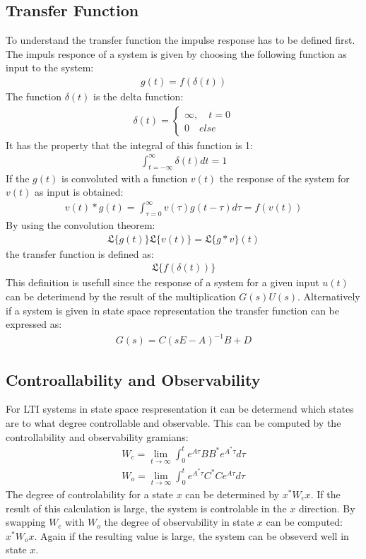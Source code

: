 \subsection{Transfer Function}
To understand the transfer function the impulse response has to be defined first.
The impuls responce of a system is given by choosing the following function as input to the system:
\begin{gather}
g(t) = f(\delta(t))
\end{gather}
The function \(\delta(t)\) is the delta function:
\begin{gather}
\delta(t) = \begin{cases}
\infty, \quad t = 0 \\
0 \quad else
\end{cases}
\end{gather}
It has the property that the integral of this function is 1:
\begin{gather}
\int_{t = -\infty}^{\infty} \delta(t) dt = 1
\end{gather}
If the \(g(t)\) is convoluted with a function \(v(t)\) the response of the system for \(v(t)\) as input is obtained:
\begin{gather}
v(t)*g(t) = \int_{\tau = 0}^{\infty} v(\tau)g(t-\tau)d\tau = f(v(t))
\end{gather}
\cite{DouglasBb}
By using the convolution theorem:
\begin{gather}
\mathfrak{L}\{g(t)\}\mathfrak{L}\{v(t)\} = \mathfrak{L}\{g*v\}(t)
\end{gather}
\cite{ABELL2018399}
the transfer function is defined as:
\begin{gather}
\mathfrak{L}\{f(\delta(t))\}
\end{gather}
This definition is usefull since the response of a system for a given input \(u(t)\) can be deterimend by the result of the multiplication \(G(s)U(s)\).
\cite{DouglasBb}
Alternatively if a system is given in state space representation the transfer function can be expressed as:
\begin{gather}
G(s) = C(sE-A)^{-1}B+D
\end{gather}
\cite{BennerGrivet}

\subsection{Controallability and Observability}
For LTI systems in state space respresentation it can be determend which states are to what degree controllable and observable.
This can be computed by the controllability and observability gramians:
\begin{gather}
W_c = \lim_{t \to \infty} \int_{0}^{t} e^{A\tau}BB^{*}e^{A^{*}\tau}d\tau \label{gram-ctrl}\\
W_o = \lim_{t \to \infty} \int_{0}^{t} e^{A^{*}\tau}C^{*}Ce^{A\tau}d\tau \label{gram-obsv}
\end{gather}
The degree of controlability for a state \(x\) can be determined by \(x^{*}W_cx\).
If the result of this calculation is large, the system is controlable in the \(x\) direction.
By swapping \(W_c\) with \(W_o\) the degree of observability in state \(x\) can be computed: \(x^{*}W_ox\).
Again if the resulting value is large, the system can be obseverd well in state \(x\).
\cite{brunton_kutz_2019d}

